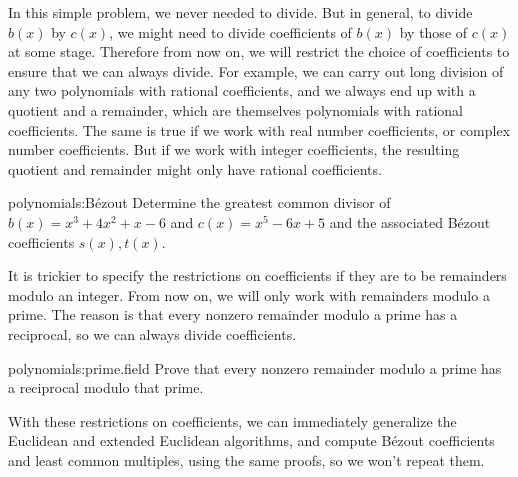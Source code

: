 In this simple problem, we never needed to divide.
But in general, to divide \(b(x)\) by \(c(x)\), we might need to divide coefficients of \(b(x)\) by those of \(c(x)\) at some stage.
Therefore from now on, we will restrict the choice of coefficients to ensure that we can always divide.
For example, we can carry out long division of any two polynomials with rational coefficients, and we always end up with a quotient and a remainder, which are themselves polynomials with rational coefficients.
The same is true if we work with real number coefficients, or complex number coefficients.
But if we work with integer coefficients, the resulting quotient and remainder might only have rational coefficients.
\begin{problem}{polynomials:B\'ezout}
Determine the greatest common divisor of \(b(x) = x^3 +4x^2+x-6\) and \(c(x) = x^5-6x+5\) and the associated B\'ezout coefficients \(s(x), t(x)\).
\end{problem}
It is trickier to specify the restrictions on coefficients if they are to be remainders modulo an integer.
From now on, we will only work with remainders modulo a prime.
The reason is that every nonzero remainder modulo a prime has a reciprocal, so we can always divide coefficients.
\begin{problem}{polynomials:prime.field}
Prove that every nonzero remainder modulo a prime has a reciprocal modulo that prime.
\end{problem}
With these restrictions on coefficients, we can immediately generalize the Euclidean and extended Euclidean algorithms, and compute B\'ezout coefficients and least common multiples, using the same proofs, so we won't repeat them.

